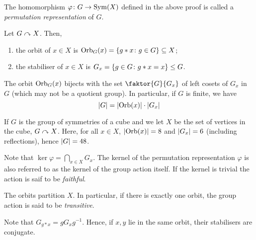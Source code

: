 \begin{definition}
	The homomorphism \( \varphi \colon G \to \operatorname{Sym}(X) \) defined in the above proof is called a \textit{permutation representation} of \( G \).
\end{definition}
\begin{definition}
	Let \( G \curvearrowright X \).
	Then,
	\begin{enumerate}
		\item the orbit of \( x \in X \) is \( \operatorname{Orb}_G(x) = \qty{g \ast x \colon g \in G} \subseteq X \);
		\item the stabiliser of \( x \in X \) is \( G_x = \qty{g \in G \colon g \ast x = x} \leq G \).
	\end{enumerate}
\end{definition}
\begin{theorem}
	The orbit \( \operatorname{Orb}_G(x) \) bijects with the set \( \faktor{G}{G_x} \) of left cosets of \( G_x \) in \( G \) (which may not be a quotient group).
	In particular, if \( G \) is finite, we have
	\[
		\abs{G} = \abs{\operatorname{Orb}(x)} \cdot \abs{G_x}
	\]
\end{theorem}
\begin{example}
	If \( G \) is the group of symmetries of a cube and we let \( X \) be the set of vertices in the cube, \( G \curvearrowright X \).
	Here, for all \( x \in X \), \( \abs{\operatorname{Orb}(x)} = 8 \) and \( \abs{G_x} = 6 \) (including reflections), hence \( \abs{G} = 48 \).
\end{example}
\begin{remark}
	Note that \( \ker \varphi = \bigcap_{x \in X} G_x \).
	The kernel of the permutation representation \( \varphi \) is also referred to as the kernel of the group action itself.
	If the kernel is trivial the action is saif to be \textit{faithful}.

	The orbits partition \( X \).
	In particular, if there is exactly one orbit, the group action is said to be \textit{transitive}.

	Note that \( G_{g \ast x} = g G_x g^{-1} \).
	Hence, if \( x, y \) lie in the same orbit, their stabilisers are conjugate.
\end{remark}

